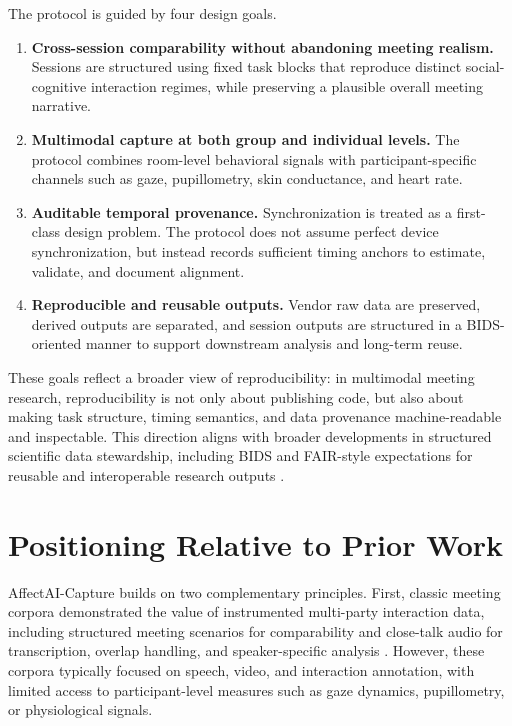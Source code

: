 \documentclass[runningheads]{llncs}
\begin{document}
The protocol is guided by four design goals.
\begin{enumerate}
\vspace{-5pt}
  \item \textbf{Cross-session comparability without abandoning meeting realism.}  
  Sessions are structured using fixed task blocks that reproduce distinct social-cognitive interaction regimes, while preserving a plausible overall meeting narrative.

    \item \textbf{Multimodal capture at both group and individual levels.}  
  The protocol combines room-level behavioral signals with participant-specific channels such as gaze, pupillometry, skin conductance, and heart rate.

  \item \textbf{Auditable temporal provenance.}  
  Synchronization is treated as a first-class design problem. The protocol does not assume perfect device synchronization, but instead records sufficient timing anchors to estimate, validate, and document alignment.

  \item \textbf{Reproducible and reusable outputs.}  
  Vendor raw data are preserved, derived outputs are separated, and session outputs are structured in a BIDS-oriented manner to support downstream analysis and long-term reuse.
\end{enumerate}
\vspace{-5pt}

These goals reflect a broader view of reproducibility: in multimodal meeting research, reproducibility is not only about publishing code, but also about making task structure, timing semantics, and data provenance machine-readable and inspectable. This direction aligns with broader developments in structured scientific data stewardship, including BIDS and FAIR-style expectations for reusable and interoperable research outputs \cite{gorgolewski2016_bids,pernet2019_eegbids,wilkinson2016_fair}.


\section{Positioning Relative to Prior Work}

AffectAI-Capture builds on two complementary principles. First, classic meeting corpora demonstrated the value of instrumented multi-party interaction data, including structured meeting scenarios for comparability and close-talk audio for transcription, overlap handling, and speaker-specific analysis \cite{carletta2005_ami,janin2003_icsi}. However, these corpora typically focused on speech, video, and interaction annotation, with limited access to participant-level measures such as gaze dynamics, pupillometry, or physiological signals.
\end{document}
